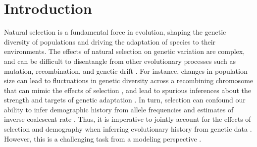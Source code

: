 \documentclass[hidelinks]{article}
\begin{document}
\section*{Introduction}
    \label{introduction}
    Natural selection is a fundamental force in evolution, shaping the
    genetic diversity of populations and driving the adaptation of
    species to their environments. The effects of natural selection
    on genetic variation are complex, and can be difficult to disentangle
    from other evolutionary processes such as mutation, recombination,
    and genetic drift \citep[e.g.,][]{gillespie1991causes}.
    For instance, changes in population size can lead to fluctuations
    in genetic diversity across a recombining chromosome 
    that can mimic the effects of selection \citep{simonsen1995properties},
    and lead to spurious inferences about the strength and targets of genetic adaptation
    \citep{simonsen1995properties,akey2004population,nielsen2005genomic}.
    In turn, selection can confound our ability to infer demographic 
    history from allele frequencies \citep{ewing2016consequences,schrider2016effects} and
    estimates of inverse coalescent rate \citep{schrider2016effects, johri2021impact, cousins2024accurate}.
    Thus, it is imperative to jointly account for the effects of selection
    and demography when inferring evolutionary history from genetic data \citep{sheehan2016deep,johri2020toward}.
    However, this is a challenging task from a modeling perspective \citep{johri2022prospect}. %
\end{document}
